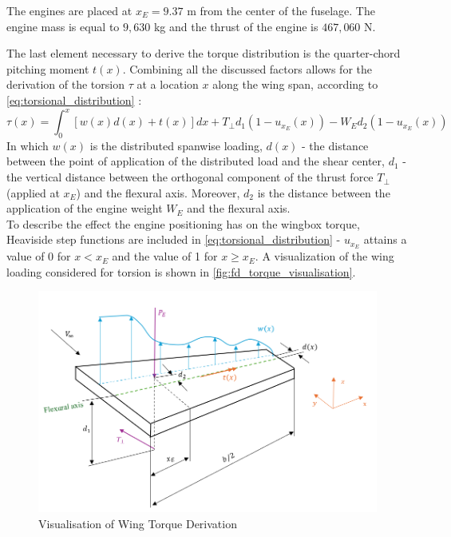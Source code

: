 \noindent The engines are placed at $x_E = 9.37$ m from the center of the fuselage. The engine mass is equal to $9,630$ kg and the thrust of the engine is $467,060$ N.


\noindent The last element necessary to derive the torque distribution is the quarter-chord pitching moment $t(x)$. Combining all the discussed factors allows for the derivation of the torsion $\tau$ at a location $x$ along the wing span, according to \autoref{eq:torsional_distribution} \cite[p. 29]{Timmer2024AE2111-IReader}: 
\begin{equation}
    \tau(x) = \int_0^{x}[w(x)d(x) + t(x)]dx + T_{\perp}d_1 \left(1 - u_{x_E}(x) \right) - W_Ed_2\left(1 - u_{x_E}(x) \right)
    \label{eq:torsional_distribution}
\end{equation}
In which $w(x)$ is the distributed spanwise loading, $d(x)$ - the distance between the point of application of the distributed load and the shear center, $d_1$ - the vertical distance between the orthogonal component of the thrust force $T_\perp$ (applied at $x_E$) and the flexural axis. Moreover, $d_2$ is the distance between the application of the engine weight $W_E$ and the flexural axis.\\

\noindent To describe the effect the engine positioning has on the wingbox torque, Heaviside step functions are included in \autoref{eq:torsional_distribution} - $u_{x_E}$ attains a value of 0 for $x<x_E$ and the value of 1 for $x\geq x_E$. A visualization of the wing loading considered for torsion is shown in \autoref{fig:fd_torque_visualisation}.\\
\begin{figure}[H]
    \centering
    \includegraphics[width=0.8\linewidth]{figures/beam_loading_torsion.png}
    \caption{Visualisation of Wing Torque Derivation}
    \label{fig:fd_torque_visualisation}
\end{figure}

